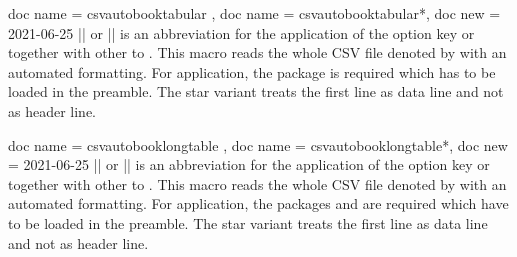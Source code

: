 \documentclass[a4paper,11pt]{ltxdoc}
\begin{document}
\begin{docCommands}[
    doc parameter = \oarg{options}\marg{file name}
  ]
  {
    { doc name = csvautobooktabular  },
    { doc name = csvautobooktabular*, doc new = 2021-06-25 }
  }
  |\csvautobooktabular| or |\csvautobooktabular*|
  is an abbreviation for the application of the option key
   or 
  together with other  to .
  This macro reads the whole CSV file denoted by 
  with an automated formatting.
  For application, the package  is required which has to be
  loaded in the preamble.
  The star variant treats the first line as data line and not as header line.
\begin{dispExample}
\end{dispExample}
\end{docCommands}


\begin{docCommands}[
    doc parameter = \oarg{options}\marg{file name}
  ]
  {
    { doc name = csvautobooklongtable  },
    { doc name = csvautobooklongtable*, doc new = 2021-06-25 }
  }
  |\csvautobooklongtable| or |\csvautobooklongtable*|
  is an abbreviation for the application of the option key
   or 
  together with other  to .
  This macro reads the whole CSV file denoted by 
  with an automated formatting.
  For application, the packages  and  are required which have to be
  loaded in the preamble.
  The star variant treats the first line as data line and not as header line.
\begin{dispListing}
\end{dispListing}
\end{docCommands}


\clearpage
\end{document}
